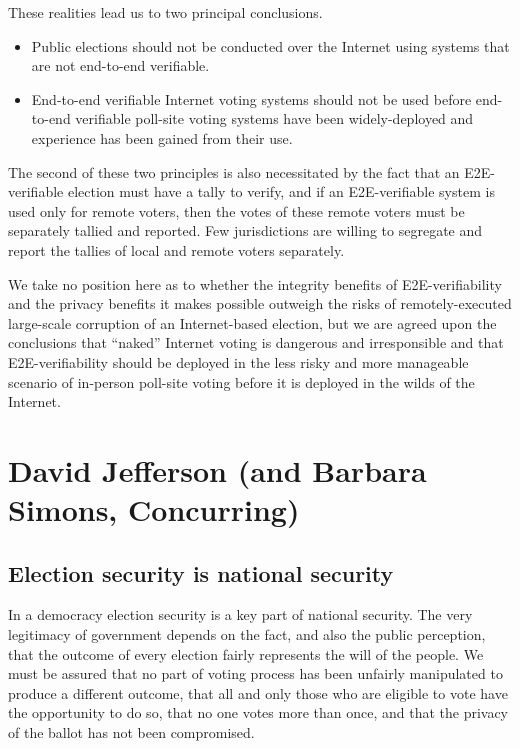 These realities lead us to two principal conclusions.

\begin{itemize}
\item Public elections should not be conducted over the Internet
using systems that are not end-to-end verifiable.

\item End-to-end verifiable Internet voting systems should not be
used before end-to-end verifiable poll-site voting systems have been
widely-deployed and experience has been gained from their use.
\end{itemize}

The second of these two principles is also necessitated by the fact
that an E2E-verifiable election must have a tally to verify, and if an
E2E-verifiable system is used only for remote voters, then the votes
of these remote voters must be separately tallied and reported.  Few
jurisdictions are willing to segregate and report the tallies of local
and remote voters separately. 

We take no position here as to whether the integrity benefits of
E2E-verifiability and the privacy benefits it makes possible outweigh
the risks of remotely-executed large-scale corruption of an
Internet-based election, but we are agreed upon the conclusions that
“naked” Internet voting is dangerous and irresponsible and that
E2E-verifiability should be deployed in the less risky and more
manageable scenario of in-person poll-site voting before it is
deployed in the wilds of the Internet.

\section{David Jefferson (and Barbara Simons, Concurring)}

\subsection{Election security is national security}

In a democracy election security is a key part of national
security. The very legitimacy of government depends on the fact, and
also the public perception, that the outcome of every election fairly
represents the will of the people. We must be assured that no part of
voting process has been unfairly manipulated to produce a different
outcome, that all and only those who are eligible to vote have the
opportunity to do so, that no one votes more than once, and that the
privacy of the ballot has not been compromised.

